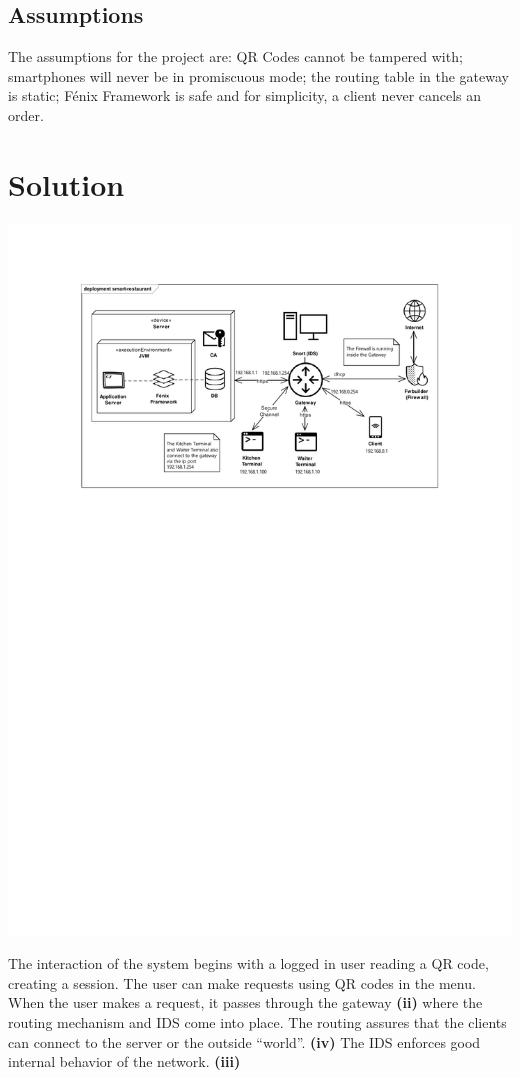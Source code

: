 \documentclass[12pt,paper=a4]{article}
\begin{document}
\subsection{Assumptions}
The assumptions for the project are: QR Codes cannot be tampered with; smartphones will never be in promiscuous mode; the routing table in the gateway is static; Fénix Framework is safe and for simplicity, a client never cancels an order.
\pagebreak
\section{Solution}

\includegraphics[trim=3.8cm 18cm 0 2cm]{Diagrama.pdf}

The interaction of the system begins with a logged in user reading a QR code, creating a session. The user can make requests using QR codes in the menu. When the user makes a request, it passes through the gateway \textbf{(ii)} where the routing mechanism and IDS come into place. The routing assures that the clients can connect to the server or the outside “world”. \textbf{(iv)} The IDS enforces good internal behavior of the network. \textbf{(iii)}
\end{document}
